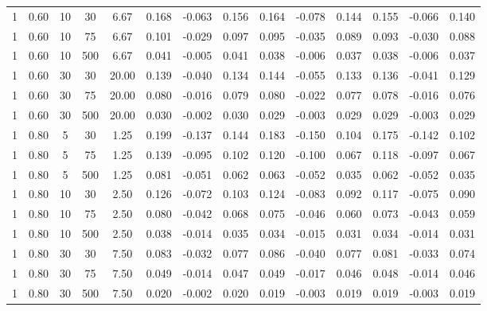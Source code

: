 \documentclass[12pt,epsfig]{article}
\begin{document}
\begin{table}[h]
{\begin{tabular}{| c | c | c | c | c || c | c | c || c | c | c || c | c | c |}
    1 & 0.60 &  10 &  30 & 6.67 & 0.168 & -0.063 & 0.156 & 0.164 & -0.078 & 0.144 & 0.155 & -0.066 & 0.140 \\ 
    1 & 0.60 &  10 &  75 & 6.67 & 0.101 & -0.029 & 0.097 & 0.095 & -0.035 & 0.089 & 0.093 & -0.030 & 0.088 \\ 
    1 & 0.60 &  10 & 500 & 6.67 & 0.041 & -0.005 & 0.041 & 0.038 & -0.006 & 0.037 & 0.038 & -0.006 & 0.037 \\ 
    1 & 0.60 &  30 &  30 & 20.00 & 0.139 & -0.040 & 0.134 & 0.144 & -0.055 & 0.133 & 0.136 & -0.041 & 0.129 \\ 
    1 & 0.60 &  30 &  75 & 20.00 & 0.080 & -0.016 & 0.079 & 0.080 & -0.022 & 0.077 & 0.078 & -0.016 & 0.076 \\ 
    1 & 0.60 &  30 & 500 & 20.00 & 0.030 & -0.002 & 0.030 & 0.029 & -0.003 & 0.029 & 0.029 & -0.003 & 0.029 \\ 
    1 & 0.80 &   5 &  30 & 1.25 & 0.199 & -0.137 & 0.144 & 0.183 & -0.150 & 0.104 & 0.175 & -0.142 & 0.102 \\ 
    1 & 0.80 &   5 &  75 & 1.25 & 0.139 & -0.095 & 0.102 & 0.120 & -0.100 & 0.067 & 0.118 & -0.097 & 0.067 \\ 
    1 & 0.80 &   5 & 500 & 1.25 & 0.081 & -0.051 & 0.062 & 0.063 & -0.052 & 0.035 & 0.062 & -0.052 & 0.035 \\ 
    1 & 0.80 &  10 &  30 & 2.50 & 0.126 & -0.072 & 0.103 & 0.124 & -0.083 & 0.092 & 0.117 & -0.075 & 0.090 \\ 
    1 & 0.80 &  10 &  75 & 2.50 & 0.080 & -0.042 & 0.068 & 0.075 & -0.046 & 0.060 & 0.073 & -0.043 & 0.059 \\ 
    1 & 0.80 &  10 & 500 & 2.50 & 0.038 & -0.014 & 0.035 & 0.034 & -0.015 & 0.031 & 0.034 & -0.014 & 0.031 \\ 
    1 & 0.80 &  30 &  30 & 7.50 & 0.083 & -0.032 & 0.077 & 0.086 & -0.040 & 0.077 & 0.081 & -0.033 & 0.074 \\ 
    1 & 0.80 &  30 &  75 & 7.50 & 0.049 & -0.014 & 0.047 & 0.049 & -0.017 & 0.046 & 0.048 & -0.014 & 0.046 \\ 
    1 & 0.80 &  30 & 500 & 7.50 & 0.020 & -0.002 & 0.020 & 0.019 & -0.003 & 0.019 & 0.019 & -0.003 & 0.019 \\ \hline
    \end{tabular}
}

\end{table}
\end{document}
